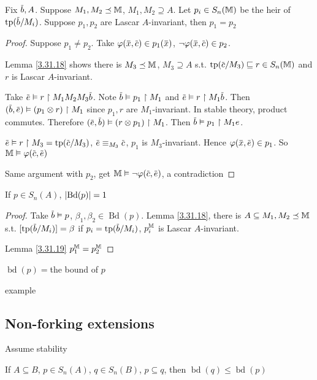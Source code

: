 \documentclass[11pt]{article}
\DeclareMathOperator{\Bd}{Bd}
\DeclareMathOperator{\tbd}{bd}
\begin{document}
\begin{lemma}[]
\label{3.31.19}
Fix \(\barb,A\). Suppose \(M_1,M_2\preceq\mathbb{M}\), \(M_1,M_2\supseteq A\). Let \(p_i\in S_n(\mathbb{M})\) be the heir
of \(\tp(\barb/M_i)\). Suppose \(p_1,p_2\) are Lascar \(A\)-invariant, then \(p_1=p_2\)
\end{lemma}

\begin{proof}
Suppose \(p_1\neq p_2\). Take \(\varphi(\barx,\barc)\in p_1(\barx)\), \(\neg\varphi(\barx,\barc)\in p_2\).

Lemma \ref{3.31.18} shows there is \(M_3\preceq\mathbb{M}\), \(M_3\supseteq A\) s.t. \(\tp(\barc/M_3)\sqsubseteq r\in S_n(\M)\) and \(r\)
is Lascar \(A\)-invariant.

Take \(\bare\vDash r\uhr M_1M_2M_3\barb\). Note \(\barb\vDash p_1\uhr M_1\) and \(\bare\vDash r\uhr M_1\barb\). Then
\((\barb,\bare)\vDash(p_1\otimes r)\uhr M_1\) since \(p_1,r\) are \(M_1\)-invariant. In stable theory, product
commutes. Therefore \((\bare,\barb)\vDash(r\otimes p_1)\uhr M_1\). Then \(\barb\vDash p_1\uhr M_1e\).

\(\bare\vDash r\uhr M_3=\tp(\barc/M_3)\), \(\bare\equiv_{M_3}\barc\), \(p_1\) is \(M_3\)-invariant.
Hence \(\varphi(\barx,\bare)\in p_1\). So \(\M\vDash\varphi(\barc,\bare)\)

Same argument with \(p_2\), get \(\M\vDash\neg\varphi(\barc,\bare)\), a contradiction
\end{proof}

\begin{theorem}[]
If \(p\in S_n(A)\), \(\abs{\Bd(p)}=1\)
\end{theorem}

\begin{proof}
Take \(\barb\vDash p\), \(\beta_1,\beta_2\in\Bd(p)\). Lemma \ref{3.31.18}, there is \(A\subseteq M_1,M_2\preceq\mathbb{M}\)
s.t. \([\tp(\barb/M_i)]=\beta\) if \(p_i=\tp(\barb/M_i)\), \(p_i^{\mathbb{M}}\) is Lascar \(A\)-invariant.

Lemma \ref{3.31.19} \(p_1^{\mathbb{M}}=p_2^{\mathbb{M}}\)
\end{proof}

\begin{definition}[]
\(\tbd(p)=\)the bound of \(p\)
\end{definition}

example
\subsection{Non-forking extensions}
\label{sec:orge66bd54}
Assume stability
\begin{proposition}[]
If \(A\subseteq B\), \(p\in S_n(A)\), \(q\in S_n(B)\), \(p\subseteq q\), then \(\tbd(q)\le\tbd(p)\)
\end{proposition}
\end{document}
